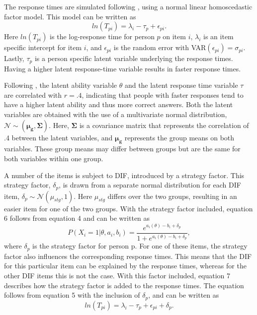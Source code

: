 \documentclass{interact}
\begin{document}
The response times are simulated following \textcite{van2007hierarchical}, using a normal linear homoscedastic factor model. This model can be written as 
\begin{equation}
    ln(T_{pi}) = \lambda_i - \tau_p + \epsilon_{pi}.
\end{equation}
Here $ln(T_{pi})$ is the log-response time for person $p$ on item $i$, $\lambda_i$ is an item specific intercept for item $i$, and $\epsilon_{pi}$ is the random error with VAR$(\epsilon_{pi}) = \sigma_{pi}$. Lastly, $\tau_p$ is a person specific latent variable underlying the response times. Having a higher latent response-time variable results in faster response times. 

Following \textcite{molenaar2018response}, the latent ability variable $\theta$ and the latent response time variable $\tau$ are correlated with $r = .4$, indicating that people with faster responses tend to have a higher latent ability and thus more correct answers. Both the latent variables are obtained with the use of a multivariate normal distribution, $\mathcal{N} \sim (\boldsymbol{\mu_g}, \boldsymbol{\Sigma})$. Here, $\boldsymbol{\Sigma}$ is a covariance matrix that represents the correlation of .4 between the latent variables, and $\boldsymbol{\mu_g}$ represents the group means on both variables. These group means may differ between groups but are the same for both variables within one group.

A number of the items is subject to DIF, introduced by a strategy factor. This strategy factor, $\delta_p$, is drawn from a separate normal distribution for each DIF item, $\delta_p \sim \mathcal{N}(\mu_{stg}, 1)$. Here $\mu_{stg}$ differs over the two groups, resulting in an easier item for one of the two groups. With the strategy factor included, equation 6 follows from equation 4 and can be written as
\begin{equation}
   P(X_{i} = 1|\theta, a_i, b_i) = \frac{e^{a_i(\theta) - b_i + \delta_p}}{1 + e^{a_i(\theta) - b_i + \delta_p}}, 
\end{equation}
where $\delta_p$ is the strategy factor for person p. For one of these items, the strategy factor also influences the corresponding response times. This means that the DIF for this particular item can be explained by the response times, whereas for the other DIF items this is not the case. With this factor included, equation 7 describes how the strategy factor is added to the response times. The equation follows from equation 5 with the inclusion of $\delta_p$, and can be written as
\begin{equation}
    ln(T_{pi}) = \lambda_i - \tau_p + \epsilon_{pi} + \delta_p.
\end{equation}
\end{document}
